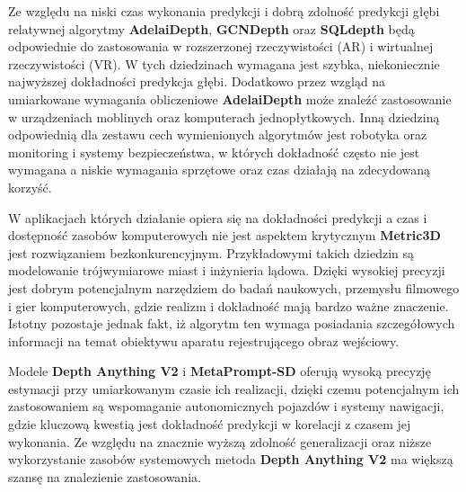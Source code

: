 Ze względu na niski czas wykonania predykcji i dobrą zdolność predykcji głębi relatywnej algorytmy \textbf{AdelaiDepth}, \textbf{GCNDepth} oraz \textbf{SQLdepth} będą odpowiednie do zastosowania w rozszerzonej rzeczywistości (AR) i wirtualnej rzeczywistości (VR). W tych dziedzinach wymagana jest szybka, niekoniecznie najwyższej dokładności predykcja głębi. Dodatkowo przez wzgląd na umiarkowane wymagania obliczeniowe \textbf{AdelaiDepth} może znaleźć zastosowanie w urządzeniach moblinych oraz komputerach jednopłytkowych. Inną dziedziną odpowiednią dla zestawu cech wymienionych algorytmów jest robotyka oraz monitoring i systemy bezpieczeństwa, w których dokładność często nie jest wymagana a niskie wymagania sprzętowe oraz czas działają na zdecydowaną korzyść.

W aplikacjach których działanie opiera się na dokładności predykcji a czas i dostępność zasobów komputerowych nie jest aspektem krytycznym \textbf{Metric3D} jest rozwiązaniem bezkonkurencyjnym. Przykładowymi takich dziedzin są modelowanie trójwymiarowe miast i inżynieria lądowa. Dzięki wysokiej precyzji jest dobrym potencjalnym narzędziem do badań naukowych, przemysłu filmowego i gier komputerowych, gdzie realizm i dokładność mają bardzo ważne znaczenie. Istotny pozostaje jednak fakt, iż algorytm ten wymaga posiadania szczegółowych informacji na temat obiektywu aparatu rejestrującego obraz wejściowy.

Modele \textbf{Depth Anything V2} i \textbf{MetaPrompt-SD} oferują wysoką precyzję estymacji przy umiarkowanym czasie ich realizacji, dzięki czemu potencjalnym ich zastosowaniem są wspomaganie autonomicznych pojazdów i systemy nawigacji, gdzie kluczową kwestią jest dokładność predykcji w korelacji z czasem jej wykonania. Ze względu na znacznie wyższą zdolność generalizacji oraz niższe wykorzystanie zasobów systemowych metoda \textbf{Depth Anything V2} ma większą szansę na znalezienie zastosowania.